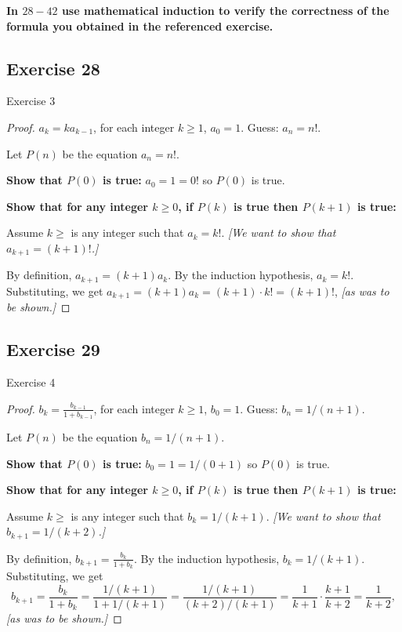 \documentclass[14pt]{extarticle}
\newcommand{\dps}{\displaystyle}
\newcommand{\cy}{\color{cyan}}
\begin{document}
{\bf \cy In $28-42$ use mathematical induction to verify the correctness of the formula you obtained in the
referenced exercise.}

\subsection{Exercise 28}
Exercise 3

\begin{proof}
    \(a_k = ka_{k-1}\), for each integer \(k \geq 1\), \(a_0 = 1\). Guess: \(a_n = n!\).

    Let $P(n)$ be the equation \(a_n = n!\).

        {\bf Show that \(P(0)\) is true:} \(a_0 = 1 = 0!\) so $P(0)$ is true.

        {\bf Show that for any integer \(k \geq 0\), if \(P(k)\) is true then \(P(k+1)\) is true:}

    Assume \(k \geq \) is any integer such that \(a_k = k!\). {\it [We want to show that \(a_{k+1} = (k+1)!\).]}

    By definition, \(a_{k+1} = (k+1)a_k\).
    By the induction hypothesis, \(a_k = k!\).
    Substituting, we get \(a_{k+1} = (k+1)a_k = (k+1) \cdot k! = (k+1)!\), {\it [as was to be shown.]}
\end{proof}

\subsection{Exercise 29}
Exercise 4

\begin{proof}
    \(b_k = \dps \frac{b_{k-1}}{1 + b_{k-1}}\), for each integer \(k \geq 1\), \(b_0 = 1\). Guess: \(b_n = 1/(n+1)\).

    Let $P(n)$ be the equation \(b_n = 1/(n+1)\).

        {\bf Show that \(P(0)\) is true:} \(b_0 = 1 = 1 / (0+1)\) so $P(0)$ is true.

        {\bf Show that for any integer \(k \geq 0\), if \(P(k)\) is true then \(P(k+1)\) is true:}

    Assume \(k \geq \) is any integer such that \(b_k = 1/(k+1)\). {\it [We want to show that \(b_{k+1} = 1/(k+2)\).]}

    By definition, \(b_{k+1} = \dps \frac{b_k}{1 + b_k}\).
    By the induction hypothesis, \(b_k = 1/(k+1)\).
    Substituting, we get
    \[
        b_{k+1} = \dps \frac{b_k}{1 + b_k} = \frac{1/(k+1)}{1 + 1/(k+1)} = \frac{1/(k+1)}{(k+2)/(k+1)} = \frac{1}{k+1} \cdot \frac{k+1}{k+2} = \frac{1}{k+2},
    \]
    {\it [as was to be shown.]}
\end{proof}
\end{document}
